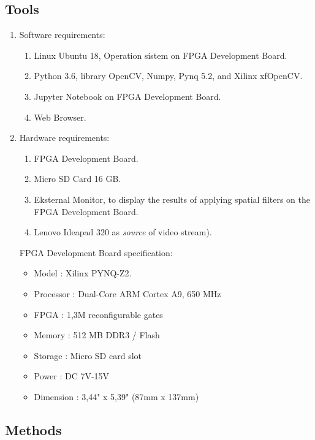 \subsection{Tools}
\begin{enumerate}[topsep=0pt,itemsep=0pt,partopsep=0pt, parsep=0pt]
    \item Software requirements:
    \begin{enumerate}[topsep=0pt,itemsep=0pt,partopsep=0pt, parsep=0pt, label={\alph*.}]
        \item Linux Ubuntu 18, Operation sistem on FPGA Development Board.
        \item Python 3.6, library OpenCV, Numpy, Pynq 5.2, and Xilinx xfOpenCV.
        \item Jupyter Notebook on FPGA Development Board. 
        \item Web Browser.
    \end{enumerate}
    \item Hardware requirements:
    \begin{enumerate}[topsep=0pt,itemsep=0pt,partopsep=0pt, parsep=0pt, label={\alph*.}]
        \item FPGA Development Board.
        \item Micro SD Card 16 GB.
        \item Eksternal Monitor, to display the results of applying spatial filters on the FPGA Development Board.
        \item Lenovo Ideapad 320 as \textit{source} of video stream).
    \end{enumerate}

    FPGA Development Board specification:
    \begin{itemize}[topsep=0pt,itemsep=0pt,partopsep=0pt, parsep=0pt]
        \item Model : Xilinx PYNQ-Z2.
        \item Processor : Dual-Core ARM Cortex A9, 650 MHz
        \item FPGA : 1,3M reconfigurable gates
        \item Memory : 512 MB DDR3 / Flash
        \item Storage : Micro SD card slot
        \item Power : DC 7V-15V
        \item Dimension : 3,44" x 5,39" (87mm x 137mm)
    \end{itemize}
\end{enumerate}


\subsection{Methods}

